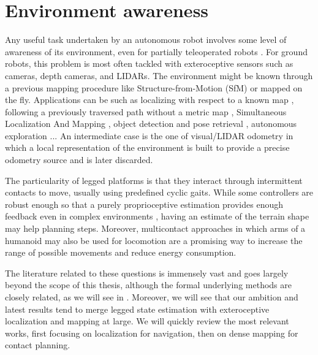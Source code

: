 \section{Environment awareness}
\label{sec:environment_awareness}
Any useful task undertaken by an autonomous robot involves some level of awareness of its environment, even for partially teleoperated robots \cite{koolen2016design}. 
For ground robots, this problem is most often tackled with exteroceptive sensors such as cameras, depth cameras, and LIDARs.
The environment might be known through a previous mapping procedure like Structure-from-Motion (SfM) \cite{triggs1999bundle} or mapped on the fly. 
Applications can be such as localizing with respect to a known map \cite{dellaert1999monte},
following a previously traversed path without a metric map \cite{furgale2010visual}, Simultaneous Localization And Mapping 
\cite{aulinas2008slam, cadena2016past}, object detection and pose retrieval \cite{du2021vision}, autonomous exploration \cite{rouvcek2019darpa, kulkarni2021autonomous}... 
An intermediate case is the one of visual/LIDAR odometry in which a local representation of the environment is built to provide a 
precise odometry source \cite{scaramuzza2011visual} and is later discarded. 


The particularity of legged platforms is that they interact through intermittent contacts to move, usually using predefined cyclic gaits. While some controllers are 
robust enough so that a purely proprioceptive estimation provides enough feedback even in complex environments \cite{tan2018sim, lee2020learning}, having an estimate of 
the terrain shape may help planning steps. Moreover, multicontact approaches \cite{carpentier2017multi, henze2017multi} in which arms of a humanoid may also be used 
for locomotion are a promising way to increase the range of possible movements and reduce energy consumption. 

The literature related to these questions is immensely vast and goes largely beyond the scope of this thesis, although the formal underlying methods are closely related,
as we will see in . Moreover, we will see that our ambition and latest results tend to merge legged state estimation with
exteroceptive localization and mapping at large. We will quickly review the most relevant works, first focusing on localization \eg for navigation, then 
on dense mapping for contact planning. 

